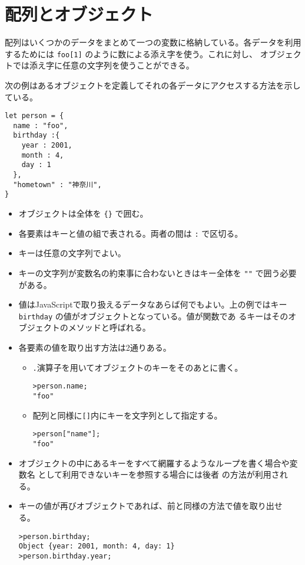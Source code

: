 \section{配列とオブジェクト}
配列はいくつかのデータをまとめて一つの変数に格納している。各データを利用
するためには \Verb+foo[1]+ のように数による添え字を使う。これに対し、
オブジェクトでは添え字に任意の文字列を使うことができる。
\begin{Exec}\label{Execconstructor}\upshape
次の例はあるオブジェクトを定義してそれの各データにアクセスする方法を示している。
\begin{Verbatim}
let person = {
  name : "foo",
  birthday :{
    year : 2001,
    month : 4,
    day : 1
  },
  "hometown" : "神奈川",
}
\end{Verbatim}
\begin{itemize}
 \item オブジェクトは全体を \Verb+{}+ で囲む。
 \item 各要素はキーと値の組で表される。両者の間は \Verb+:+ で区切る。
 \item キーは任意の文字列でよい。
 \item キーの文字列が変数名の約束事に合わないときはキー全体を \Verb+""+
			 で囲う必要がある。
 \item 値はJavaScriptで取り扱えるデータなあらば何でもよい。上の例ではキー
       \Verb+birthday+ の値がオブジェクトとなっている。値が関数であ
       るキーはそのオブジェクトのメソッドと呼ばれる。
 \item 各要素の値を取り出す方法は2通りある。
\begin{itemize}
 \item \Verb+.+演算子を用いてオブジェクトのキーをそのあとに書く。
\begin{Verbatim}
>person.name;
"foo"
\end{Verbatim}
 \item 配列と同様に\Verb+[]+内にキーを文字列として指定する。
\begin{Verbatim}
>person["name"];
"foo"
\end{Verbatim}
\end{itemize}
 \item オブジェクトの中にあるキーをすべて網羅するようなループを書く場合や変数名
       として利用できないキーを参照する場合には後者
       の方法が利用される。
 \item キーの値が再びオブジェクトであれば、前と同様の方法で値を取り出せ
       る。
\begin{Verbatim}
>person.birthday;
Object {year: 2001, month: 4, day: 1}
>person.birthday.year;

\end{Verbatim}
\end{itemize}
\end{Exec}

